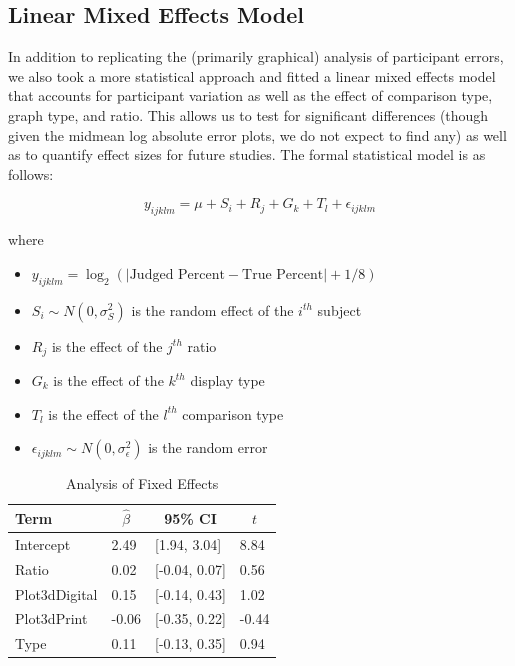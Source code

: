 \documentclass[letterpaper,inpress,dvipsnames]{jdsart}
\begin{document}
\hypertarget{linear-mixed-effects-model}{%
\subsection{Linear Mixed Effects Model}\label{linear-mixed-effects-model}}

In addition to replicating the (primarily graphical) analysis of participant errors, we also took a more statistical approach and fitted a linear mixed effects model that accounts for participant variation as well as the effect of comparison type, graph type, and ratio. This allows us to test for significant differences (though given the midmean log absolute error plots, we do not expect to find any) as well as to quantify effect sizes for future studies. The formal statistical model is as follows:

\[y_{ijklm}=\mu+S_i + R_j + G_k +T_l + \epsilon_{ijklm}\]

\noindent where

\begin{itemize}
\item
  \(y_{ijklm}=\log_2(|\text{Judged Percent} - \text{True Percent}|+1/8)\)
\item
  \(S_i\sim N(0,\sigma^2_S)\) is the random effect of the \(i^{th}\) subject
\item
  \(R_j\) is the effect of the \(j^{th}\) ratio
\item
  \(G_k\) is the effect of the \(k^{th}\) display type
\item
  \(T_l\) is the effect of the \(l^{th}\) comparison type
\item
  \(\epsilon_{ijklm}\sim N(0,\sigma^2_\epsilon)\) is the random error
\end{itemize}

\begin{table}[tbp]

\begin{center}
\begin{threeparttable}

\caption{\label{tab:unnamed-chunk-2}Analysis of Fixed Effects}

\begin{tabular}{llll}
\toprule
Term & \multicolumn{1}{c}{$\hat{\beta}$} & \multicolumn{1}{c}{95\% CI} & \multicolumn{1}{c}{$t$}\\
\midrule
Intercept & 2.49 & {}[1.94, 3.04] & 8.84\\
Ratio & 0.02 & {}[-0.04, 0.07] & 0.56\\
Plot3dDigital & 0.15 & {}[-0.14, 0.43] & 1.02\\
Plot3dPrint & -0.06 & {}[-0.35, 0.22] & -0.44\\
Type & 0.11 & {}[-0.13, 0.35] & 0.94\\
\bottomrule
\end{tabular}

\end{threeparttable}
\end{center}

\end{table}
\end{document}
